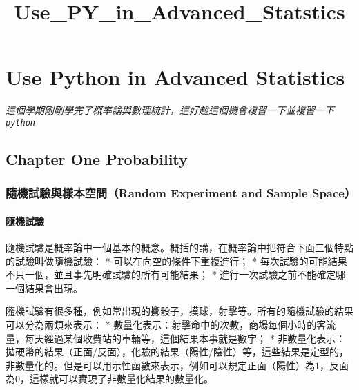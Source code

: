 \documentclass[11pt]{article}
\title{Use\_PY\_in\_Advanced\_Statstics}
\begin{document}
    
    
    \maketitle
    
    

    
    \hypertarget{use-python-in-advanced-statistics}{%
\section{Use Python in Advanced
Statistics}\label{use-python-in-advanced-statistics}}

\emph{這個學期剛剛學完了概率論與數理統計，這好趁這個機會複習一下並複習一下
\texttt{python}} 

    \hypertarget{chapter-one-probability}{%
\subsection{Chapter One Probability}\label{chapter-one-probability}}

\hypertarget{ux96a8ux6a5fux8a66ux9a57ux8207ux6a23ux672cux7a7aux9593random-experiment-and-sample-space}{%
\subsubsection{隨機試驗與樣本空間（Random Experiment and Sample
Space）}\label{ux96a8ux6a5fux8a66ux9a57ux8207ux6a23ux672cux7a7aux9593random-experiment-and-sample-space}}

\hypertarget{ux96a8ux6a5fux8a66ux9a57}{%
\paragraph{隨機試驗}\label{ux96a8ux6a5fux8a66ux9a57}}

隨機試驗是概率論中一個基本的概念。概括的講，在概率論中把符合下面三個特點的試驗叫做隨機試驗：
* 可以在向空的條件下重複進行； *
每次試驗的可能結果不只一個，並且事先明確試驗的所有可能結果； *
進行一次試驗之前不能確定哪一個結果會出現。

隨機試驗有很多種，例如常出現的擲骰子，摸球，射擊等。所有的隨機試驗的結果可以分為兩類來表示：
*
數量化表示：射擊命中的次數，商場每個小時的客流量，每天經過某個收費站的車輛等，這個結果本事就是數字；
*
非數量化表示：拋硬幣的結果（正面/反面），化驗的結果（陽性/陰性）等，這些結果是定型的，非數量化的。但是可以用示性函數來表示，例如可以規定正面（陽性）為\(1\)，反面為\(0\)，這樣就可以實現了非數量化結果的數量化。
\end{document}
